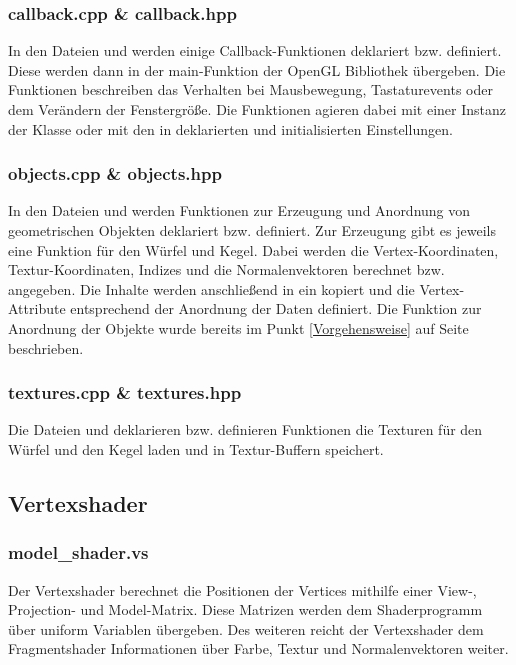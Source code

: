 \documentclass{article}
\begin{document}
\subsubsection{callback.cpp \& callback.hpp}
In den Dateien  und  werden einige Callback-Funktionen deklariert bzw. definiert. 
Diese werden dann in der main-Funktion der OpenGL Bibliothek übergeben. Die Funktionen beschreiben das Verhalten bei
Mausbewegung, Tastaturevents oder dem Verändern der Fenstergröße. Die Funktionen agieren dabei mit einer Instanz der Klasse
 oder mit den in  deklarierten und  initialisierten Einstellungen.
\subsubsection{objects.cpp \& objects.hpp}
In den Dateien  und  werden Funktionen zur Erzeugung und Anordnung von geometrischen
Objekten deklariert bzw. definiert. Zur Erzeugung gibt es jeweils eine Funktion für den Würfel und Kegel.
Dabei werden die Vertex-Koordinaten, Textur-Koordinaten, Indizes und die Normalenvektoren berechnet bzw. angegeben.
Die Inhalte werden anschließend in ein  kopiert und die Vertex-Attribute entsprechend
der Anordnung der Daten definiert. Die Funktion zur Anordnung der Objekte wurde bereits im Punkt \ref{Vorgehensweise}
 auf Seite \pageref{Vorgehensweise}
beschrieben.
\subsubsection{textures.cpp \& textures.hpp}
Die Dateien  und  deklarieren bzw. definieren Funktionen die Texturen für den
Würfel und den Kegel laden und in Textur-Buffern speichert.

\subsection{Vertexshader}
\subsubsection{model\_shader.vs}
Der Vertexshader  berechnet die Positionen der Vertices mithilfe einer View-,
Projection- und Model-Matrix. Diese Matrizen werden dem Shaderprogramm über uniform Variablen übergeben.
Des weiteren reicht der Vertexshader dem Fragmentshader Informationen über Farbe, Textur und Normalenvektoren weiter.
\end{document}
